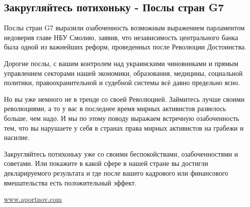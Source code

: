  
 
 
 
 
\subsection{Закругляйтесь потихоньку - Послы стран G7}
\label{sec:20_06_2020.fb.portnov_andrej.1.g7}

Послы стран G7 выразили озабоченность возможным выражением парламентом
недоверия главе НБУ Смолию, заявив, что независимость центрального банка была
одной из важнейших реформ, проведенных после Революции Достоинства. 

Дорогие послы, с вашим контролем над украинскими чиновниками и прямым
управлением секторами нашей экономики, образования, медицины, социальной
политики, правоохранительной и судебной системы всё давно предельно ясно. 

Но вы уже немного не в тренде со своей Революцией. Займитесь лучше своими
революциями, а то у вас в последнее время мирных активистов развелось больше,
чем надо. И мы по этому поводу выражаем встречную озабоченность тем, что вы
нарушаете у себя в странах права мирных активистов на грабежи и насилие. 

Закругляйтесь потихоньку уже со своими беспокойствами, озабоченностями и
советами. Или покажите в какой сфере в нашей стране вы достигли декларируемого
результата и где после вашего кадрового или финансового вмешательства есть
положительный эффект.

\url{www.aportnov.com}
